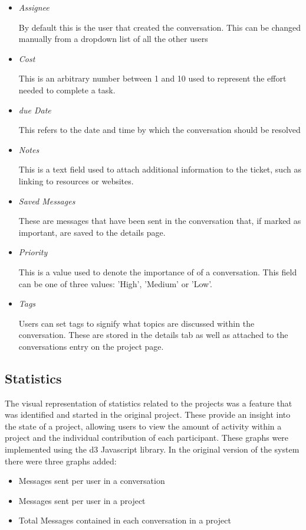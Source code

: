 \documentclass{l4proj}
\begin{document}
\begin{itemize}
\item \textit{Assignee} 
\par By default this is the user that created the conversation.  This can be changed manually from a dropdown list of all the other users
\item \textit{Cost}
\par This is an arbitrary number between 1 and 10 used to represent the effort needed to complete a task. 
\item \textit{due Date}
\par This refers to the date and time by which the conversation should be resolved
\item \textit{Notes}
\par This is a text field used to attach additional information to the ticket, such as linking to resources or websites. 
\item \textit{Saved Messages}
\par These are messages that have been sent in the conversation that, if marked as important, are saved to the details page. 
\item \textit{Priority}
\par This is a value used to denote the importance of of a conversation.  This field can be one of three values: 'High', 'Medium' or 'Low'.
\item \textit{Tags} 
\par Users can set tags to signify what topics are discussed within the conversation.  These are stored in the details tab as well as attached to the conversations entry on the project page.
\end{itemize}

\subsection{Statistics}

The visual representation of statistics related to the projects was a feature that was identified and started in the original project.  These provide an insight into the state of a project, allowing users to view the amount of activity within a project and the individual contribution of each participant.  These graphs were implemented using the d3 Javascript library.
In the original version of the system there were three graphs added:

\begin{itemize}
\item Messages sent per user in a conversation
\item Messages sent per user in a project
\item Total Messages contained in each conversation in a project
\end{itemize}
\end{document}
